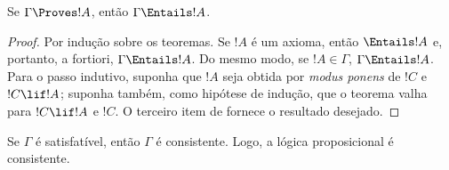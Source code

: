 \documentclass[../../../include/open-logic-section]{subfiles}
\begin{document}


\begin{thm}[Correção] 
Se $\Gamma\Proves!A$, então
$\Gamma \Entails !A$. 
\end{thm}

\begin{proof} 
Por indução sobre os teoremas. Se $!A$ é um axioma, então $\Entails
!A$ e, portanto, a fortiori, $\Gamma \Entails!A$. Do mesmo modo, se $!A \in \Gamma$,
$\Gamma \Entails!A$. Para o passo indutivo, suponha que $!A$ seja obtida por
\emph{modus ponens} de $!C$ e $!C\lif!A$; suponha também, como hipótese de
indução, que o teorema valha para $!C\lif !A$ e $!C$. O terceiro item
de  fornece o resultado desejado. 
\end{proof}

\begin{cor} 
Se $\Gamma$ é satisfatível, então $\Gamma$ é consistente. Logo,
a lógica proposicional é consistente. 
\end{cor}
\end{document}
